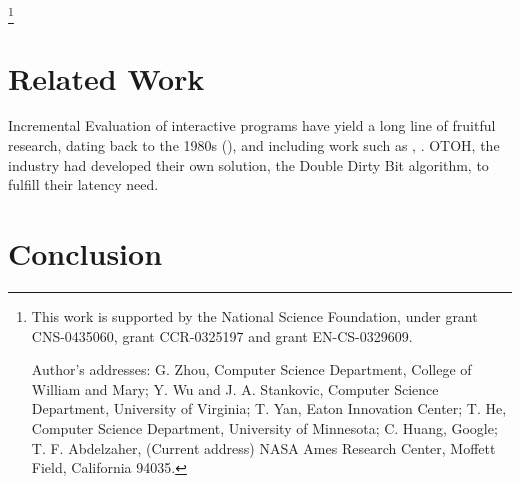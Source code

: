 \documentclass[format=acmsmall, review=true, screen=true]{acmart}
\begin{document}



\thanks{This work is supported by the National Science Foundation,
  under grant CNS-0435060, grant CCR-0325197 and grant EN-CS-0329609.

  Author's addresses: G. Zhou, Computer Science Department, College of
  William and Mary; Y. Wu {and} J. A. Stankovic, Computer Science
  Department, University of Virginia; T. Yan, Eaton Innovation Center;
  T. He, Computer Science Department, University of Minnesota; C.
  Huang, Google; T. F. Abdelzaher, (Current address) NASA Ames
  Research Center, Moffett Field, California 94035.}


\maketitle

\renewcommand{\shortauthors}{M. Kirisame et al.}






\section{Related Work}
Incremental Evaluation of interactive programs have yield a long line of fruitful research, dating back to the 1980s (\citet{TR}), and including work such as \cite{yufeng-2}, \cite{SAC}. OTOH, the industry had developed their own solution, the Double Dirty Bit algorithm, to fulfill their latency need.
\section{Conclusion}
%


\end{document}
